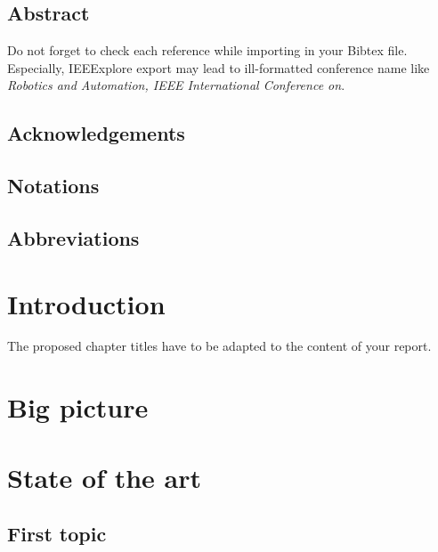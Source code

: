 \documentclass{thesisreport}
\begin{document}
   
 
  \section*{Abstract}
   
 Do not forget to check each reference while importing in your Bibtex file.
 Especially, IEEExplore export may lead to ill-formatted conference name like \emph{Robotics and Automation, 
 IEEE International Conference on}.
 
 
 \newpage
 
 \section*{Acknowledgements}
 
 \newpage
 
 
 \section*{Notations}
 
 \newpage
 
  \section*{Abbreviations}
 
 \newpage
 
 \listoffigures
 
\listoftables
 
 \tableofcontents
 
 
 \chapter*{Introduction}
 
The proposed chapter titles have to be adapted to the content of your report.

 \chapter{Big picture}
 
 \chapter{State of the art}
 
 \section{First topic}
 
\end{document}
